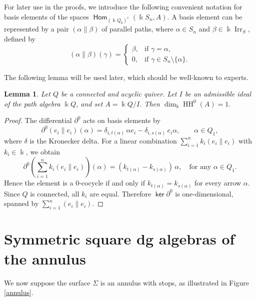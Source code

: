 \documentclass[a4paper, reqno, 11pt]{amsart}
\newtheorem{lemma}[theorem]{Lemma}
\theoremstyle{definition}
\newcommand{\opname}[1]{\operatorname{\mathsf{#1}}}
\renewcommand{\ker}{\opname{ker}\nolimits}
\newcommand{\Hom}{\opname{Hom}}
\begin{document}
	For later use in the proofs, we introduce the following convenient notation for basis elements of the spaces $\Hom_{(\Bbbk Q_0)^e}(\Bbbk S_n, A)$.  
	A basis element can be represented by a pair $(\alpha \parallel \beta)$ of parallel paths, where $\alpha \in S_n$ and $\beta \in \Bbbk \operatorname{Irr}_S$, defined by
	\[
	(\alpha \parallel \beta)(\gamma) = 
	\begin{cases}
		\beta, & \text{if } \gamma = \alpha, \\[2pt]
		0, & \text{if } \gamma \in S_n \setminus \{\alpha\}.
	\end{cases}
	\]
	
	The following lemma will be used later, which should be well-known to experts.
	\begin{lemma}
		\label{lemma:HH0-dimension}
		Let $Q$ be a connected and acyclic quiver.  
		Let $I$ be an admissible ideal of the path algebra $\Bbbk Q$, and set $A = \Bbbk Q / I$. Then
		\(
		\dim_{\Bbbk} \operatorname{HH}^0(A) = 1.
		\)
	\end{lemma}
	
	\begin{proof}
		The differential $\partial^0$ acts on basis elements by
		\[
		\partial^0(e_i \parallel e_i)(\alpha) = \delta_{i,t(\alpha)}\,\alpha e_i - \delta_{i,s(\alpha)}\,e_i\alpha,\qquad \alpha\in Q_1,
		\]
		where $\delta$ is the Kronecker delta. 
		For a linear combination $\sum\limits_{i=1}^n k_i (e_i\parallel e_i)$ with $k_i\in\Bbbk$, we obtain
		\[
		\partial^0\left(\sum\limits_{i=1}^n k_i (e_i\parallel e_i)\right)(\alpha) = (k_{t(\alpha)}-k_{s(\alpha)})\,\alpha, \quad \text{for any $\alpha \in Q_1.$}
		\]
		Hence the element is a $0$-cocycle if and only if $k_{t(\alpha)}=k_{s(\alpha)}$ for every arrow $\alpha$. Since $Q$ is connected, all $k_i$ are equal. Therefore $\ker\partial^0$ is one‑dimensional, spanned by $\sum\limits_{i=1}^n (e_i\parallel e_i)$.
	\end{proof}
	
	
	
	\section{Symmetric square dg algebras of the annulus}
	We now suppose the surface $\Sigma$ is an annulus with stops, as illustrated in Figure \ref{annulus}. 
	
\end{document}

